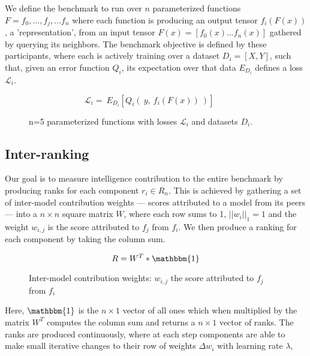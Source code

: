 \documentclass{article}
\begin{document}
We define the benchmark to run over $n$ parameterized functions $F = {f_0, ...,  f_j, ...f_n}$ where each function is producing an output tensor $f_i(F(x))$, a 'representation', from an input tensor $F(x) = [f_0(x) ... f_n(x)]$ gathered by querying its neighbors. The benchmark objective is defined by these participants, where each is actively training over a dataset $D_i=[X,Y]$, such that, given an error function $Q_i$, its expectation over that data $E_D_i$ defines a loss $\mathcal{L}_i$.
\bigskip

\[ \mathcal{L}_i = \  E_D_i[Q_i( \ y, \ f_i(F(x)) \ )]  \ \ \ \  \textrm{ } \]


\begin{figure}[H]
    \centering
    \hspace*{-2cm}
    
    \label{fig:progdense_diagram}
    \caption{n=5 parameterized functions with losses $\mathcal{L}_i$ and datasets $D_i$.}
\end{figure}{}

\subsection{Inter-ranking}

Our goal is to measure intelligence contribution to the entire benchmark by producing ranks for each component $r_i \in R_n$. This is achieved by gathering a set of inter-model contribution weights --- scores attributed to a model from its peers --- into a $n \times n$ square matrix $W$, where each row sums to 1, $||w_i||_1 = 1$ and the weight $w_{i,j}$ is the score attributed to $f_j$ from $f_i$. We then produce a ranking for each component by taking the column sum. 
\bigskip

\[ R = W^T * \mathbbm{1}  \]

 \begin{figure}[H]
    \centering
    \hspace*{-2cm}
    
    \label{fig:progdense_diagram}
    \caption{Inter-model contribution weights: $w_{i,j}$ the score attributed to $f_j$ from $f_i$}
\end{figure}{}

Here, $\mathbbm{1}$ is the $n \times 1$ vector of all ones which when multiplied by the matrix $W^T$ computes the column sum and returns a $n \times 1$ vector of ranks. The ranks are produced continuously, where at each step components are able to make small iterative changes to their row of weights $\Delta w_i$ with learning rate $\lambda$,
\end{document}
